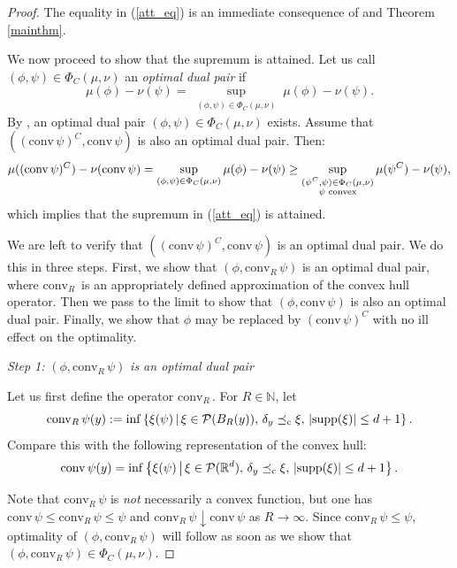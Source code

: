 \documentclass[reqno, a4paper]{amsart}
\newcommand{\lc}{\preceq_{\textnormal{c}}}
\newcommand{\conv}{\mathrm{conv}\,}
\newcommand{\convr}{\mathrm{conv}_R\,}
\newcommand{\cP}{\mathcal{P}}
\renewcommand{\P}{\cP}
\newcommand{\midauto}{\,\middle\vert\,}
\newcommand{\R}{\mathbb R}
\theoremstyle{definition}
\theoremstyle{definition}
\theoremstyle{definition}
\begin{document}
\begin{proof}
    The equality in (\ref{att_eq}) is an immediate consequence of \cite[Theorem 2.2]{BePaRiSc25} and Theorem \ref{mainthm}.

We now proceed to show that the supremum is attained. Let us call $(\phi,\psi)\in\Phi_C(\mu,\nu)$ an \textit{optimal dual pair} if $$\mu(\phi)-\nu(\psi)=\sup_{\substack{(\phi,\psi)\in\Phi_C(\mu,\nu)}} \mu(\phi)-\nu(\psi).$$
By \cite[Theorem 2.2]{BePaRiSc25}, an optimal dual pair $(\phi,\psi)\in\Phi_C(\mu,\nu)$ exists.
Assume that  $((\conv\psi)^C,\conv \psi)$ is also an optimal dual pair. Then:
$$\mu((\conv\psi)^C)-\nu(\conv \psi)=\sup_{\substack{(\phi,\psi)\in\Phi_C(\mu,\nu)}} \mu(\phi)-\nu(\psi)\geq\sup_{\substack{(\psi^C,\psi)\in\Phi_C(\mu,\nu)\\\psi \textnormal{ convex}}} \mu(\psi^C)-\nu(\psi),$$
which implies that the supremum in (\ref{att_eq}) is attained.


We are left to verify that $((\conv\psi)^C,\conv \psi)$ is an optimal dual pair. We do this in three steps. First, we show that $(\phi,\convr\psi)$ is an optimal dual pair, where $\convr$ is an appropriately defined approximation of the convex hull operator. Then we pass to the limit to show that $(\phi,\conv\psi)$ is also an optimal dual pair. Finally, we show that $\phi$ may be replaced by $(\conv\psi)^C$ with no ill effect on the optimality. 

\textit{Step 1:} $(\phi,\convr\psi) $ \textit{is an optimal dual pair}

\noindent Let us first define the operator $\convr$. For $R\in \mathbb N$, let $$\convr\psi(y):=\inf\left\{ \xi(\psi)\midauto \xi\in\P(B_R(y)),\, \delta_y\lc\xi,\, |\textnormal {supp}(\xi)|\leq d+1\right\}.$$ 
Compare this with the following representation of the convex hull:
\begin{equation}
\label{conv_hull_gen}
\conv\psi(y)=\inf\left\{ \xi(\psi)\midauto \xi\in\P(\R^d),\, \delta_y\lc\xi,\, |\textnormal {supp}(\xi)|\leq d+1\right\}.
\end{equation} 

Note that $\convr\psi$ is \textit{not} necessarily a convex function, but one has $\conv\psi \leq\convr\psi\leq\psi$ and $\convr\psi\downarrow\conv\psi$ as $R\to\infty$. Since $\convr\psi\leq\psi$, optimality of $(\phi,\convr\psi)$ will follow as soon as we show that $(\phi,\convr\psi) \in\Phi_C(\mu,\nu).$


\end{proof}
\end{document}
